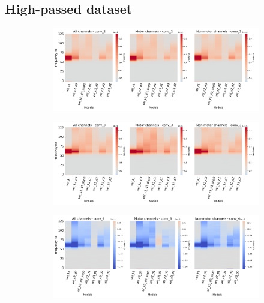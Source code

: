 \subsection*{High-passed dataset}\label{subsec:vel-high-passed-dataset-appendixB}
\begin{figure}[!htpb]
\centering
\begin{subfigure}[b]{\textwidth}
   \includegraphics[width=1\linewidth]{img/appendix/A/conv-2/hp-sm/vel-model-gradients_all_kinds}
   \caption{}
   \label{fig:vel-hp-shifted-grads-conv-2}
\end{subfigure}

\begin{subfigure}[b]{\textwidth}
   \includegraphics[width=1\linewidth]{img/appendix/A/conv-3/hp-sm/vel-model-gradients_all_kinds}
   \caption{}
   \label{fig:vel-hp-shifted-grads-conv-3}
\end{subfigure}

\begin{subfigure}[b]{\textwidth}
   \includegraphics[width=1\linewidth]{img/appendix/A/conv-4/hp-sm/vel-model_gradients_all_kinds}
   \caption{}
   \label{fig:vel-hp-shifted-grads-conv-4}
\end{subfigure}


\end{figure}

